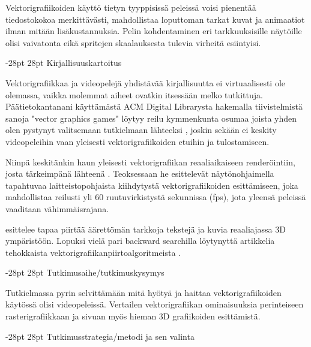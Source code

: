 \documentclass[a4paper,12pt,final,twoside]{report}
\makeatletter
\renewcommand\chapter{\@startsection{chapter}{1}{\z@}
		{-28pt}
		{28pt}
		{\fontsize{14pt}{14pt}\selectfont}
	}
\makeatother
\begin{document}
Vektorigrafiikoiden käyttö tietyn tyyppisissä peleissä voisi pienentää tiedostokokoa merkittävästi, mahdollistaa loputtoman tarkat kuvat ja animaatiot ilman mitään lisäkustannuksia. Pelin kohdentaminen eri tarkkuuksisille näytöille olisi vaivatonta eikä spritejen skaalauksesta tulevia virheitä esiintyisi.

\chapter{Kirjallisuuskartoitus}

Vektorigrafiikkaa ja videopelejä yhdistävää kirjallisuutta ei virtuaalisesti ole olemassa, vaikka molemmat aiheet ovatkin itsessään melko tutkittuja. Päätietokantanani käyttämästä ACM Digital Librarysta hakemalla tiivistelmistä sanoja "vector graphics games"  löytyy reilu kymmenkunta osumaa joista yhden olen pystynyt valitsemaan tutkielmaan lähteeksi \parencite{RefWorks:doc:5bc4a5cde4b0f79042082292}, joskin sekään ei keskity videopeleihin vaan yleisesti vektorigrafiikoiden etuihin ja tulostamiseen.

Niinpä keskitänkin haun yleisesti vektorigrafiikan reaaliaikaiseen renderöintiin, josta tärkeimpänä lähteenä \textcite{RefWorks:doc:5bc4a5cce4b080e02f7eff1b}. Teoksessaan he esittelevät näytönohjaimella tapahtuvaa laitteistopohjaista kiihdytystä vektorigrafiikoiden esittämiseen, joka mahdollistaa reilusti yli 60 ruutuvirkistystä sekunnissa (fps), jota yleensä peleissä vaaditaan vähimmäisrajana.

\textcite{RefWorks:doc:5bc4a5cbe4b0af09f17dfdc1} esittelee tapaa piirtää äärettömän tarkkoja tekstejä ja kuvia reaaliajassa 3D ympäristöön. Lopuksi vielä pari backward searchilla löytynyttä artikkelia tehokkaista vektorigrafiikanpiirtoalgoritmeista \parencites{RefWorks:doc:5bc4a5cbe4b095ca6e593f15}{RefWorks:doc:5bc4a5cbe4b067d1d7447f29}.

\chapter{Tutkimusaihe/tutkimuskysymys}

Tutkielmassa pyrin selvittämään mitä hyötyä ja haittaa vektorigrafiikoiden käytössä olisi videopeleissä. Vertailen vektorigrafiikan ominaisuuksia perinteiseen rasterigrafiikkaan ja sivuan myös hieman 3D grafiikoiden esittämistä.

\chapter{Tutkimusstrategia/metodi ja sen valinta}
\end{document}
